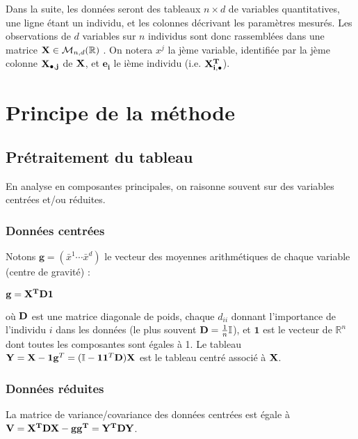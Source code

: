 \documentclass[letterpaper,10pt,french]{sphinxmanual}
\begin{document}
\sphinxAtStartPar
Dans la suite, les données seront des tableaux \(n\times d\) de variables quantitatives, une ligne étant un individu, et les colonnes décrivant les paramètres mesurés. Les observations de \(d\) variables sur \(n\) individus sont donc rassemblées dans une matrice \({\bf X}\in\mathcal{M}_{n,d}(\mathbb{R})\) .  On notera \(x^j\) la j\sphinxhyphen{}ème variable, identifiée par la j\sphinxhyphen{}ème colonne \({\bf X_{\bullet,j}}\) de \({\bf X}\), et \(\mathbf{e_i}\) le i\sphinxhyphen{}ème individu (i.e. \({\bf X_{i,\bullet}^T}\)).


\section{Principe de la méthode}
\label{\detokenize{acp:principe-de-la-methode}}

\subsection{Pré\sphinxhyphen{}traitement du tableau}
\label{\detokenize{acp:pre-traitement-du-tableau}}
\sphinxAtStartPar
En analyse en composantes principales, on raisonne souvent sur des variables centrées et/ou réduites.


\subsubsection{Données centrées}
\label{\detokenize{acp:donnees-centrees}}
\sphinxAtStartPar
Notons \(\mathbf{g} = \left ( \bar{x}^1\cdots \bar{x}^d\right )\) le vecteur des moyennes arithmétiques de chaque variable (centre de gravité) :

\sphinxAtStartPar
\(\mathbf{g}={\bf X^TD\mathbf{1}}\)

\sphinxAtStartPar
où \({\bf D}\) est une matrice diagonale de poids,  chaque \(d_{ii}\) donnant l’importance de l’individu \(i\) dans les données (le plus souvent \({\bf D}=\frac{1}{n}{ \mathbb{I}}\)),  et \(\mathbf{1}\) est le vecteur de \(\mathbb{R}^n\) dont toutes les composantes sont égales à 1. Le tableau \({\bf Y}={\bf X}-\mathbf{1}\mathbf{g}^T=({ \mathbb{I}}-\mathbf{1}\mathbf{1}^T{\bf D}){\bf X}\) est le tableau centré associé à \({\bf X}\).


\subsubsection{Données réduites}
\label{\detokenize{acp:donnees-reduites}}
\sphinxAtStartPar
La matrice de variance/covariance des données centrées est égale à
\({\bf V} = {\bf X^TDX} - \mathbf{g}\mathbf{g^T} = {\bf Y^TDY}\).
\end{document}
